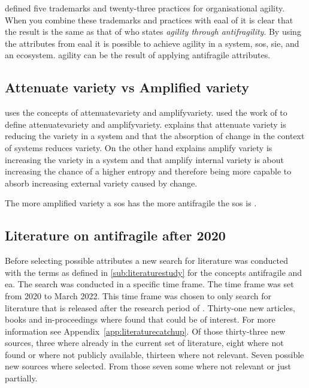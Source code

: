 \textcite[p.~7]{Aghina2018} defined five trademarks and twenty-three practices for organisational \gls{agility}. When you combine these trademarks and practices with \acrfull{eaal} of \textcite[p.~69]{Botjes2020} it is clear that the result is the same as that of \textcite[Abstract]{OReilly2019} who states \textit{\Gls{agility} through \Gls{antifragility}}. By using the attributes from \acrshort{eaal} it is possible to achieve \gls{agility} in a system, \acrlong{sos}, \acrlong{sie}, and an ecosystem. \Gls{agility} can be the result of applying \gls{antifragile} attributes.

\subsection{Attenuate variety vs Amplified variety}
\label{sub:attenuatevsaplify}

\textcite[p.~4]{Botjes2021} uses the concepts of \gls{attenuatevariety} and \gls{amplifyvariety}. \textcite[p.~4]{Botjes2021} used the work of \textcites{Ashby1979}{Beer1994} to define \gls{attenuatevariety} and \gls{amplifyvariety}. \textcite[p.~4]{Botjes2021} explains that attenuate variety is reducing the variety in a system and that the absorption of change in the context of systems reduces variety. On the other hand \textcite[p.~4]{Botjes2021} explains amplify variety is increasing the variety in a system and that amplify internal variety is about increasing the chance of a higher entropy and therefore being more capable to absorb increasing external variety caused by change. 

The more amplified variety a \acrshort{sos} has the more antifragile the \acrshort{sos} is \needsref.

\subsection{Literature on antifragile after 2020}
\label{sub:literatureaffoundafter2020}
Before selecting possible attributes a new search for literature was conducted with the terms as defined in \cref{sub:literaturestudy} for the concepts \gls{antifragile} and \acrshort{ea}. The search was conducted in a specific time frame. The time frame was set from 2020 to March 2022. This time frame was chosen to only search for literature that is released after the research period of \textcite{Botjes2020}. Thirty-one new articles, books and in-proceedings where found that could be of interest. For more information see Appendix~\ref{app:literaturecatchup}. Of those thirty-three new sources, three where already in the current set of literature, eight where not found or where not publicly available, thirteen where not relevant. Seven possible new sources where selected. From those seven some where not relevant or just partially.


